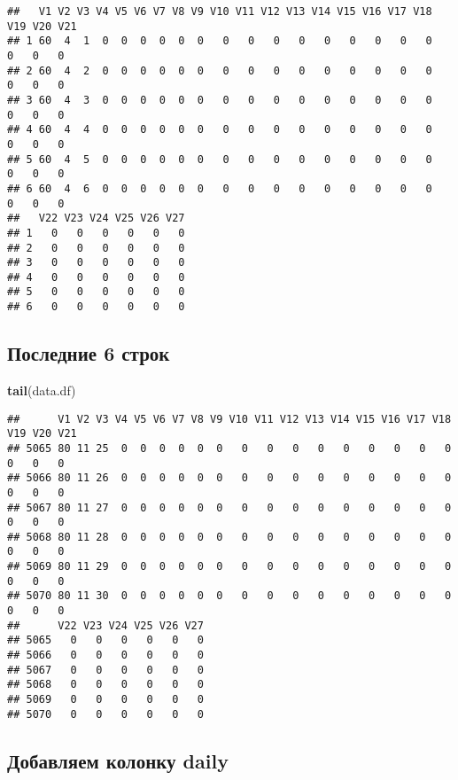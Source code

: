 \documentclass[
]{article}
\newenvironment{Shaded}{\begin{snugshade}}{\end{snugshade}}
\newcommand{\FunctionTok}[1]{\textcolor[rgb]{0.13,0.29,0.53}{\textbf{#1}}}
\newcommand{\NormalTok}[1]{#1}
\begin{document}
\begin{verbatim}
##   V1 V2 V3 V4 V5 V6 V7 V8 V9 V10 V11 V12 V13 V14 V15 V16 V17 V18 V19 V20 V21
## 1 60  4  1  0  0  0  0  0  0   0   0   0   0   0   0   0   0   0   0   0   0
## 2 60  4  2  0  0  0  0  0  0   0   0   0   0   0   0   0   0   0   0   0   0
## 3 60  4  3  0  0  0  0  0  0   0   0   0   0   0   0   0   0   0   0   0   0
## 4 60  4  4  0  0  0  0  0  0   0   0   0   0   0   0   0   0   0   0   0   0
## 5 60  4  5  0  0  0  0  0  0   0   0   0   0   0   0   0   0   0   0   0   0
## 6 60  4  6  0  0  0  0  0  0   0   0   0   0   0   0   0   0   0   0   0   0
##   V22 V23 V24 V25 V26 V27
## 1   0   0   0   0   0   0
## 2   0   0   0   0   0   0
## 3   0   0   0   0   0   0
## 4   0   0   0   0   0   0
## 5   0   0   0   0   0   0
## 6   0   0   0   0   0   0
\end{verbatim}

\subsection{Последние 6
строк}\label{ux43fux43eux441ux43bux435ux434ux43dux438ux435-6-ux441ux442ux440ux43eux43a}

\begin{Shaded}
\begin{Highlighting}[]
\FunctionTok{tail}\NormalTok{(data.df)}
\end{Highlighting}
\end{Shaded}

\begin{verbatim}
##      V1 V2 V3 V4 V5 V6 V7 V8 V9 V10 V11 V12 V13 V14 V15 V16 V17 V18 V19 V20 V21
## 5065 80 11 25  0  0  0  0  0  0   0   0   0   0   0   0   0   0   0   0   0   0
## 5066 80 11 26  0  0  0  0  0  0   0   0   0   0   0   0   0   0   0   0   0   0
## 5067 80 11 27  0  0  0  0  0  0   0   0   0   0   0   0   0   0   0   0   0   0
## 5068 80 11 28  0  0  0  0  0  0   0   0   0   0   0   0   0   0   0   0   0   0
## 5069 80 11 29  0  0  0  0  0  0   0   0   0   0   0   0   0   0   0   0   0   0
## 5070 80 11 30  0  0  0  0  0  0   0   0   0   0   0   0   0   0   0   0   0   0
##      V22 V23 V24 V25 V26 V27
## 5065   0   0   0   0   0   0
## 5066   0   0   0   0   0   0
## 5067   0   0   0   0   0   0
## 5068   0   0   0   0   0   0
## 5069   0   0   0   0   0   0
## 5070   0   0   0   0   0   0
\end{verbatim}

\subsection{Добавляем колонку
daily}\label{ux434ux43eux431ux430ux432ux43bux44fux435ux43c-ux43aux43eux43bux43eux43dux43aux443-daily}
\end{document}
